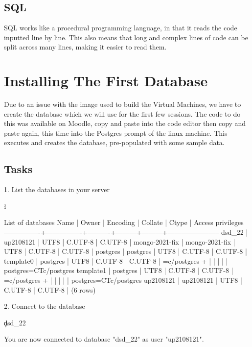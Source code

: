 \subsection*{SQL}
SQL works like a procedural programming language, in that it reads the code inputted line by line. This also means that long and complex lines of code can be split across many lines, making it easier to read them.

\section*{Installing The First Database}
Due to an issue with the image used to build the Virtual Machines, we have to create the database which we will use for the first few sessions. The code to do this was available on Moodle, copy and paste into the code editor then copy and paste again, this time into the Postgres prompt of the linux machine. This executes and creates the database, pre-populated with some sample data.
\subsection*{Tasks}
1. List the databases in your server
\begin{sql}
\l
\end{sql}
\begin{pseudo*}
                                 List of databases
    Name      |     Owner      | Encoding | Collate |  Ctype  |   Access privileges        
----------------+----------------+----------+---------+---------+-----------------------     
dsd_22         | up2108121      | UTF8     | C.UTF-8 | C.UTF-8 |
mongo-2021-fix | mongo-2021-fix | UTF8     | C.UTF-8 | C.UTF-8 |
postgres       | postgres       | UTF8     | C.UTF-8 | C.UTF-8 |
template0      | postgres       | UTF8     | C.UTF-8 | C.UTF-8 | =c/postgres          +     
               |                |          |         |         | postgres=CTc/postgres      
template1      | postgres       | UTF8     | C.UTF-8 | C.UTF-8 | =c/postgres          +     
               |                |          |         |         | postgres=CTc/postgres      
up2108121      | up2108121      | UTF8     | C.UTF-8 | C.UTF-8 |
(6 rows)
\end{pseudo*}

2. Connect to the database 
\begin{sql}
\c dsd_22
\end{sql}
\begin{pseudo*}
You are now connected to database "dsd_22" as user "up2108121".
\end{pseudo*}

